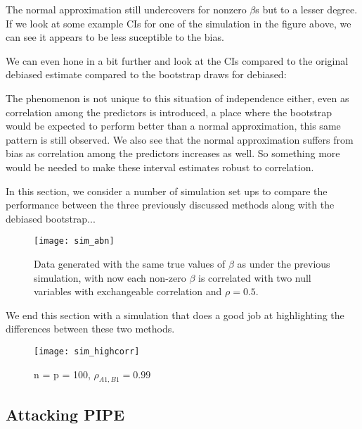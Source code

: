 The normal approximation still undercovers for nonzero $\beta$s but to a lesser degree. If we look at some example CIs for one of the simulation in the figure above, we can see it appears to be less suceptible to the bias.

We can even hone in a bit further and look at the CIs compared to the original debiased estimate compared to the bootstrap draws for debiased:

The phenomenon is not unique to this situation of independence either, even as correlation among the predictors is introduced, a place where the bootstrap would be expected to perform better than a normal approximation, this same pattern is still observed. We also see that the normal approximation suffers from bias as correlation among the predictors increases as well. So something more would be needed to make these interval estimates robust to correlation. 


In this section, we consider a number of simulation set ups to compare the performance between the three previously discussed methods along with the debiased bootstrap...

\begin{figure}[hbtp]
    \begin{center}
    \texttt{[image: sim\_abn]}
    \caption{\label{Fig:sim_abn} Data generated with the same true values of $\beta$ as under the previous simulation, with now each non-zero $\beta$ is correlated with two null variables with exchangeable correlation and $\rho = 0.5$.}
    \end{center}
\end{figure}

We end this section with a simulation that does a good job at highlighting the differences between these two methods. 

\begin{figure}[hbtp]
    \begin{center}
    \texttt{[image: sim\_highcorr]}
    \caption{\label{Fig:sim_highcorr} n = p = 100, $\rho_{A1, B1} = 0.99$}
    \end{center}
\end{figure}

\subsection{Attacking PIPE}

